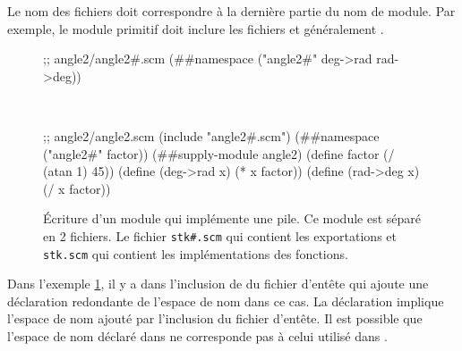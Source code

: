 Le nom des fichiers doit correspondre à la dernière partie du nom de module.  Par
exemple, le module primitif  doit inclure les fichiers
 et généralement .\\
\begin{figure}[ht]
\begin{mplisting}{0.9}
;; angle2/angle2#.scm
(##namespace ("angle2#" deg->rad rad->deg))
\end{mplisting}\\[4ex]
\begin{mplisting}{0.9}
;; angle2/angle2.scm
(include "angle2#.scm")
(##namespace ("angle2#" factor))
(##supply-module angle2)
(define factor (/ (atan 1) 45))
(define (deg->rad x) (* x factor))
(define (rad->deg x) (/ x factor))
\end{mplisting}
  \caption{Écriture d'un module qui implémente une pile. Ce module est
           séparé en 2 fichiers. Le fichier \texttt{stk\#.scm} qui contient les
           exportations et \texttt{stk.scm} qui contient les implémentations des
           fonctions.}
  \label{fig:module->angle}
\end{figure}


%

Dans l'exemple \ref{fig:module->angle}, il y a dans 
l'inclusion de du fichier d'entête  qui ajoute une
déclaration redondante de l'espace de nom dans ce cas.  La déclaration
 implique l'espace de nom ajouté par
l'inclusion du fichier d'entête. Il est possible que l'espace de nom déclaré
dans  ne corresponde pas à celui utilisé dans
.

